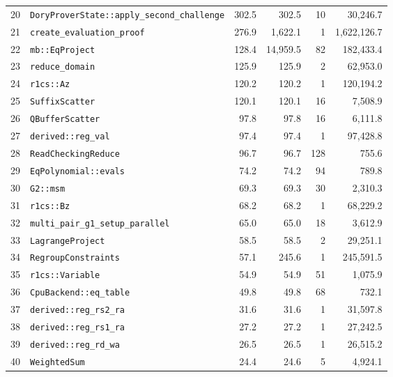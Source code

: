 \documentclass[10pt,a4paper]{article}
\begin{document}
\begin{longtable}{r l r r r r}
20 & \texttt{DoryProverState::apply\_second\_challenge} & 302.5 & 302.5 & 10 & 30,246.7 \\
21 & \texttt{create\_evaluation\_proof} & 276.9 & 1,622.1 & 1 & 1,622,126.7 \\
22 & \texttt{mb::EqProject} & 128.4 & 14,959.5 & 82 & 182,433.4 \\
23 & \texttt{reduce\_domain} & 125.9 & 125.9 & 2 & 62,953.0 \\
24 & \texttt{r1cs::Az} & 120.2 & 120.2 & 1 & 120,194.2 \\
25 & \texttt{SuffixScatter} & 120.1 & 120.1 & 16 & 7,508.9 \\
26 & \texttt{QBufferScatter} & 97.8 & 97.8 & 16 & 6,111.8 \\
27 & \texttt{derived::reg\_val} & 97.4 & 97.4 & 1 & 97,428.8 \\
28 & \texttt{ReadCheckingReduce} & 96.7 & 96.7 & 128 & 755.6 \\
29 & \texttt{EqPolynomial::evals} & 74.2 & 74.2 & 94 & 789.8 \\
30 & \texttt{G2::msm} & 69.3 & 69.3 & 30 & 2,310.3 \\
31 & \texttt{r1cs::Bz} & 68.2 & 68.2 & 1 & 68,229.2 \\
32 & \texttt{multi\_pair\_g1\_setup\_parallel} & 65.0 & 65.0 & 18 & 3,612.9 \\
33 & \texttt{LagrangeProject} & 58.5 & 58.5 & 2 & 29,251.1 \\
34 & \texttt{RegroupConstraints} & 57.1 & 245.6 & 1 & 245,591.5 \\
35 & \texttt{r1cs::Variable} & 54.9 & 54.9 & 51 & 1,075.9 \\
36 & \texttt{CpuBackend::eq\_table} & 49.8 & 49.8 & 68 & 732.1 \\
37 & \texttt{derived::reg\_rs2\_ra} & 31.6 & 31.6 & 1 & 31,597.8 \\
38 & \texttt{derived::reg\_rs1\_ra} & 27.2 & 27.2 & 1 & 27,242.5 \\
39 & \texttt{derived::reg\_rd\_wa} & 26.5 & 26.5 & 1 & 26,515.2 \\
40 & \texttt{WeightedSum} & 24.4 & 24.6 & 5 & 4,924.1 \\
\bottomrule \end{longtable}
\end{document}
